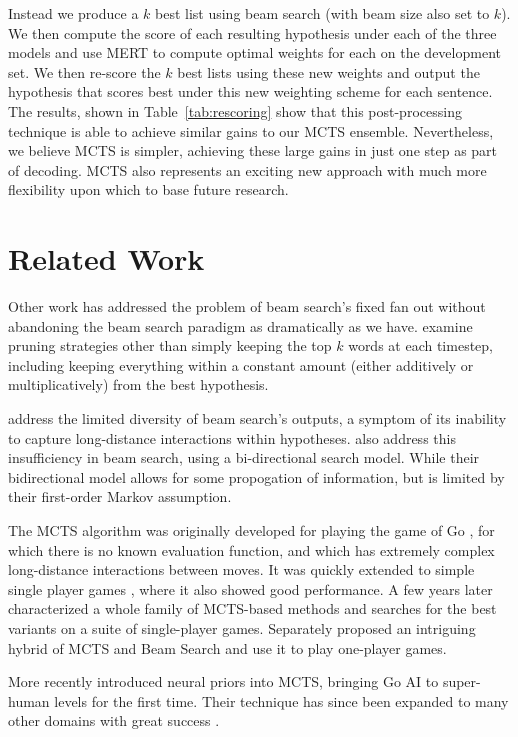 \documentclass[11pt,a4paper]{article}
\begin{document}
Instead we produce a $k$ best list using beam search (with beam size also set
to $k$). We then compute the score of each resulting hypothesis under each of
the three models and use MERT \cite{och2003minimum} to compute optimal weights
for each on the development set. We then re-score the $k$ best lists using
these new weights and output the hypothesis that scores best under this new
weighting scheme for each sentence. The results, shown in
Table~\ref{tab:rescoring} show that this post-processing technique is able to
achieve similar gains to our MCTS ensemble. Nevertheless, we believe MCTS is
simpler, achieving these large gains in just one step as part of decoding. MCTS
also represents an exciting new approach with much more flexibility upon which
to base future research.

\section{Related Work}
\label{sec:related_work}
Other work has addressed the problem of beam search's fixed fan out without
abandoning the beam search paradigm as dramatically as we have.
 examine pruning strategies other than simply keeping
the top $k$ words at each timestep, including keeping everything within a
constant amount (either additively or multiplicatively) from the best
hypothesis.

 address the limited diversity of beam search's
outputs, a symptom of its inability to capture long-distance interactions
within hypotheses.  also address this
insufficiency in beam search, using a bi-directional search model. While their
bidirectional model allows for some propogation of information, but is limited
by their first-order Markov assumption.

The MCTS algorithm was originally developed for playing the game of Go
\cite{coulom2006efficient}, for which there is no known evaluation function,
and which has extremely complex long-distance interactions between moves. It
was quickly extended to simple single player games \cite{schadd2008single},
where it also showed good performance. A few years later
 characterized a whole family of MCTS-based methods and
searches for the best variants on a suite of single-player games. Separately
 proposed an intriguing hybrid of MCTS and Beam Search
and use it to play one-player games.

More recently  introduced neural priors into MCTS,
bringing Go AI to super-human levels for the first time. Their technique has
since been expanded to many other domains with great success \cite[inter
alia]{silver2017mastering,pinheiro2017geometric,lee2018deep,luckow2018monte}.
\end{document}
